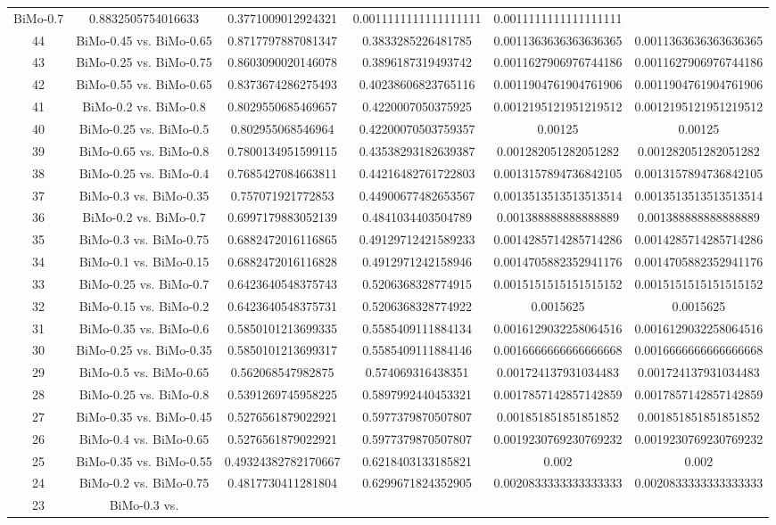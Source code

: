 \documentclass[a4paper,10pt]{article}
\begin{document}
\begin{landscape}
\begin{table}[!htp]
\begin{tabular}{cccccc}
BiMo-0.7&0.8832505754016633&0.3771009012924321&0.0011111111111111111&0.0011111111111111111\\44&BiMo-0.45 vs. BiMo-0.65&0.8717797887081347&0.3833285226481785&0.0011363636363636365&0.0011363636363636365\\43&BiMo-0.25 vs. BiMo-0.75&0.8603090020146078&0.3896187319493742&0.0011627906976744186&0.0011627906976744186\\42&BiMo-0.55 vs. BiMo-0.65&0.8373674286275493&0.40238606823765116&0.0011904761904761906&0.0011904761904761906\\41&BiMo-0.2 vs. BiMo-0.8&0.8029550685469657&0.4220007050375925&0.0012195121951219512&0.0012195121951219512\\40&BiMo-0.25 vs. BiMo-0.5&0.802955068546964&0.42200070503759357&0.00125&0.00125\\39&BiMo-0.65 vs. BiMo-0.8&0.7800134951599115&0.43538293182639387&0.001282051282051282&0.001282051282051282\\38&BiMo-0.25 vs. BiMo-0.4&0.7685427084663811&0.44216482761722803&0.0013157894736842105&0.0013157894736842105\\37&BiMo-0.3 vs. BiMo-0.35&0.757071921772853&0.44900677482653567&0.0013513513513513514&0.0013513513513513514\\36&BiMo-0.2 vs. BiMo-0.7&0.6997179883052139&0.4841034403504789&0.001388888888888889&0.001388888888888889\\35&BiMo-0.3 vs. BiMo-0.75&0.6882472016116865&0.49129712421589233&0.0014285714285714286&0.0014285714285714286\\34&BiMo-0.1 vs. BiMo-0.15&0.6882472016116828&0.4912971242158946&0.0014705882352941176&0.0014705882352941176\\33&BiMo-0.25 vs. BiMo-0.7&0.6423640548375743&0.5206368328774915&0.0015151515151515152&0.0015151515151515152\\32&BiMo-0.15 vs. BiMo-0.2&0.6423640548375731&0.5206368328774922&0.0015625&0.0015625\\31&BiMo-0.35 vs. BiMo-0.6&0.5850101213699335&0.5585409111884134&0.0016129032258064516&0.0016129032258064516\\30&BiMo-0.25 vs. BiMo-0.35&0.5850101213699317&0.5585409111884146&0.0016666666666666668&0.0016666666666666668\\29&BiMo-0.5 vs. BiMo-0.65&0.562068547982875&0.574069316438351&0.001724137931034483&0.001724137931034483\\28&BiMo-0.25 vs. BiMo-0.8&0.5391269745958225&0.5897992440453321&0.0017857142857142859&0.0017857142857142859\\27&BiMo-0.35 vs. BiMo-0.45&0.5276561879022921&0.5977379870507807&0.001851851851851852&0.001851851851851852\\26&BiMo-0.4 vs. BiMo-0.65&0.5276561879022921&0.5977379870507807&0.0019230769230769232&0.0019230769230769232\\25&BiMo-0.35 vs. BiMo-0.55&0.49324382782170667&0.6218403133185821&0.002&0.002\\24&BiMo-0.2 vs. BiMo-0.75&0.4817730411281804&0.6299671824352905&0.0020833333333333333&0.0020833333333333333\\23&BiMo-0.3 vs. 
\end{tabular}
\end{table}
\end{landscape}
\end{document}
